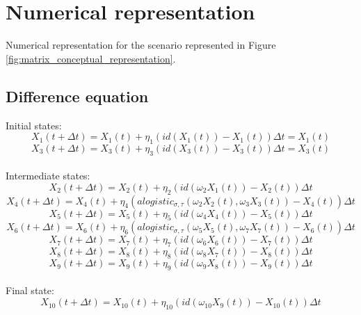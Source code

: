 \documentclass[a4paper]{article}
\begin{document}
\section{Numerical representation}

Numerical representation for the scenario represented in Figure \ref{fig:matrix_conceptual_representation}.

\subsection{Difference equation}

Initial states:
\begin{equation}
X_{1}(t+\Delta t) = X_{1}(t) + \eta_{1} ( id(X_{1}(t)) - X_{1}(t))\Delta t = X_{1}(t)
\end{equation}
\begin{equation}
X_{3}(t+\Delta t) = X_{3}(t) + \eta_{3} ( id(X_{3}(t)) - X_{3}(t))\Delta t = X_{3}(t)
\end{equation}
\\
Intermediate states:
\begin{equation}
X_{2}(t+\Delta t) = X_{2}(t) + \eta_{2} (id(\omega_{2} X_{1}(t)) - X_{2}(t))\Delta t
\end{equation}
\begin{equation}
X_{4}(t+\Delta t) = X_{4}(t) + \eta_{4} ( alogistic_{\sigma ,\tau}(\omega_{2} X_{2}(t),\omega_{3} X_{3}(t)) - X_{4}(t))\Delta t
\end{equation}
\begin{equation}
X_{5}(t+\Delta t) = X_{5}(t) + \eta_{5} (id(\omega_{4} X_{4}(t)) - X_{5}(t))\Delta t
\end{equation}
\begin{equation}
X_{6}(t+\Delta t) = X_{6}(t) + \eta_{6} (alogistic_{\sigma ,\tau}(\omega_{5} X_{5}(t),\omega_{7} X_{7}(t)) - X_{6}(t))\Delta t
\end{equation}
\begin{equation}
X_{7}(t+\Delta t) = X_{7}(t) + \eta_{7} (id(\omega_{6} X_{6}(t)) - X_{7}(t))\Delta t
\end{equation}
\begin{equation}
X_{8}(t+\Delta t) = X_{8}(t) + \eta_{8} (id(\omega_{8} X_{7}(t)) - X_{8}(t))\Delta t
\end{equation}
\begin{equation}
X_{9}(t+\Delta t) = X_{9}(t) + \eta_{9} (id(\omega_{9} X_{8}(t)) - X_{9}(t))\Delta t
\end{equation}
\\
Final state:
\begin{equation}
X_{10}(t+\Delta t) = X_{10}(t) + \eta_{10} (id(\omega_{10} X_{9}(t)) - X_{10}(t))\Delta t
\end{equation}
\end{document}

